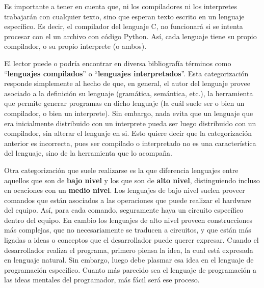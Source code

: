 Es importante a tener en cuenta que, ni los compiladores ni los interpretes trabajarán
con cualquier texto, sino que esperan texto escrito en un lenguaje específico.
Es decir, el compilador del lenguaje C, no funcionará si se intenta procesar con
el un archivo con código Python. Así, cada lenguaje tiene su propio compilador,
o su propio interprete (o ambos).

El lector puede o podría encontrar en diversa bibliografía términos como
``\textbf{lenguajes compilados}'' o ``\textbf{lenguajes interpretados}''. Esta
categorización responde simplemente al hecho de que, en general, el autor del
lenguaje provee asociado a la definición su lenguaje (gramática, semántica, etc.),
la herramienta que permite generar programas en dicho lenguaje (la cuál suele ser
o bien un compilador, o bien un interprete). Sin embargo, nada evita que
un lenguaje que era inicialmente distribuido con un interprete pueda ser luego
distribuido con un compilador, sin alterar el lenguaje en si. Esto quiere
decir que la categorización anterior es incorrecta, pues ser compilado o
interpretado no es una característica del lenguaje, sino de la herramienta que
lo acompaña.

Otra categorización que suele realizarse es la que diferencia lenguajes entre
aquellos que son de \textbf{bajo nivel} y los que son de \textbf{alto nivel},
distinguiendo incluso en ocaciones con un \textbf{medio nivel}. Los lenguajes
de bajo nivel suelen proveer comandos que están asociados a las operaciones que
puede realizar el hardware del equipo. Así, para cada comando, seguramente haya
un circuito específico dentro del equipo. En cambio los lenguajes de alto nivel
proveen construcciones más complejas, que no necesariamente se traducen a circuitos,
y que están más ligadas a ideas o conceptos que el desarrollador puede querer
expresar. Cuando el desarrollador realiza el programa, primero piensa la idea,
la cual está expresada en lenguaje natural. Sin embargo, luego debe plasmar esa
idea en el lenguaje de programación específico. Cuanto más parecido sea el lenguaje
de programación a las ideas mentales del programador, más fácil será ese proceso.
\autocite{wexelblat_1981}

